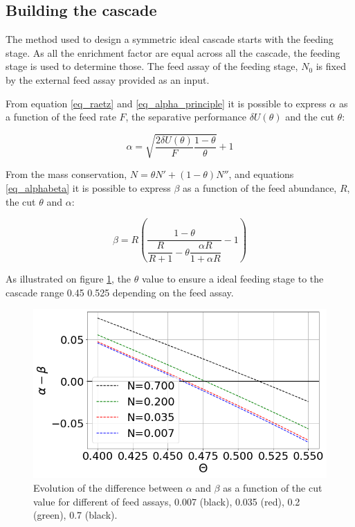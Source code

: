 \subsection{Building the cascade}

The method used to design a symmetric ideal cascade starts with the feeding
stage. As all the enrichment factor are equal across all the cascade, the
feeding stage is used to determine those.
The feed assay of the feeding stage, $N_{0}$ is fixed by the external feed assay
provided as an input.

From equation \eqref{eq_raetz} and \eqref{eq_alpha_principle} it is possible to
express $\alpha$ as a function of the feed rate $F$, the separative performance
$\delta U(\theta)$ and the cut $\theta$:

\begin{equation} \label{eq_alpha}
    \alpha = \sqrt{\frac{2\delta U(\theta)}{F} \frac{1-\theta}{\theta}} + 1
\end{equation}


From the mass conservation, $N = \theta N' + (1-\theta)N''$, and equations
\eqref{eq_alphabeta} it is possible to express $\beta$ as a function of the
feed abundance, $R$, the cut $\theta$ and $\alpha$:

\begin{equation}\label{eq_beta}
    \beta =   R \left(\dfrac{1-\theta}
                     {\dfrac{R}{R+1}- \theta \dfrac{\alpha R}{1+\alpha R}} -1\right)
\end{equation}


As illustrated on figure \ref{fig_a_m_b}, the $\theta$ value to ensure a ideal feeding
stage to the cascade range 0.45 0.525 depending on the feed assay.

\begin{figure}[h!] %
    \centering
    \includegraphics[scale=0.5]{alpha_minus_beta}
    \caption{Evolution of the difference between $\alpha$ and $\beta$ as a
    function of the cut value for different of feed assays, 0.007 (black),
    0.035 (red), 0.2 (green), 0.7 (black). }
    \label{fig_a_m_b}
\end{figure}

